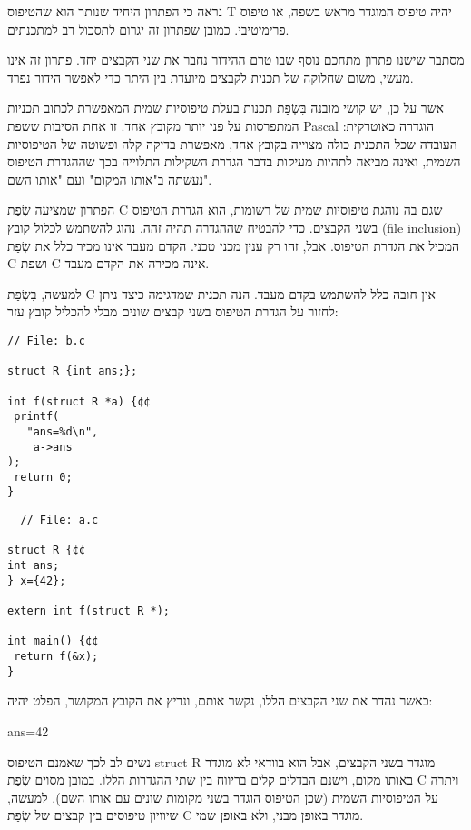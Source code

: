 \begin{טבלא}[!htbp]
      נראה כי הפתרון היחיד שנותר הוא שהטיפוס T יהיה טיפוס המוגדר מראש בשפה, או טיפוס פרימיטיבי. כמובן שפתרון זה יגרום לתסכול רב למתכנתים.

      מסתבר שישנו פתרון מתחכם נוסף שבו טרם ההידור נחבר את שני הקבצים יחד. פתרון זה אינו מעשי, משום שחלוקה של תכנית לקבצים מיועדת בין היתר כדי לאפשר הידור נפרד.

      אשר על כן, יש קושי מובנה בִּשְׂפַת תכנות בעלת טיפוסיות שמית המאפשרת לכתוב תכניות
      המתפרסות על פני יותר מקובץ אחד. זו אחת הסיבות ששפת Pascal הוגדרה כאוטרקית:
      העובדה שכל התכנית כולה מצוייה בקובץ אחד, מאפשרת בדיקה קלה ופשוטה של הטיפוסיות
      השמית, ואינה מביאה לתהיות מעיקות בדבר הגדרת השקילות התלוייה בכך שההגדרת הטיפוס
      נעשתה ב"אותו המקום" ועם "אותו השם".

      הפתרון שמציעה שְׂפַת C שגם בה נוהגת טיפוסיות שמית של רשומות, הוא הגדרת הטיפוס בשני
      הקבצים. כדי להבטיח שההגדרה תהיה זהה, נהוג להשתמש לכלול קובץ (file inclusion)
      המכיל את הגדרת הטיפוס. אבל, זהו רק ענין מכני טכני. הקדם מעבד אינו מכיר כלל את
      שְׂפַת C ושפת C אינה מכירה את הקדם מעבד.

      למעשה, בִּשְׂפַת C אין חובה כלל להשתמש בקדם מעבד. הנה תכנית שמדגימה כיצד ניתן לחזור
      על הגדרת הטיפוס בשני קבצים שונים מבלי להכליל קובץ עזר:

\begin{verbatim}
// File: b.c

struct R {int ans;};

int f(struct R *a) {¢¢
 printf(
   "ans=%d\n",
    a->ans
);
 return 0;
}

\end{verbatim}

\begin{verbatim}
  // File: a.c

struct R {¢¢
int ans;
} x={42};

extern int f(struct R *);

int main() {¢¢
 return f(&x);
}
\end{verbatim}

      כאשר נהדר את שני הקבצים הללו, נקשר אותם, ונריץ את הקובץ המקושר, הפלט יהיה:

      ans=42

      נשים לב לכך שאמנם הטיפוס struct R מוגדר בשני הקבצים, אבל הוא בוודאי לא מוגדר באותו מקום, וישנם הבדלים קלים בריווח בין שתי ההגדרות הללו. במובן מסוים שְׂפַת C ויתרה על הטיפוסיות השמית (שכן הטיפוס הוגדר בשני מקומות שונים עם אותו השם). למעשה, שיוויון טיפוסים בין קבצים של שְׂפַת C מוגדר באופן מבני, ולא באופן שמי.


\end{טבלא}
